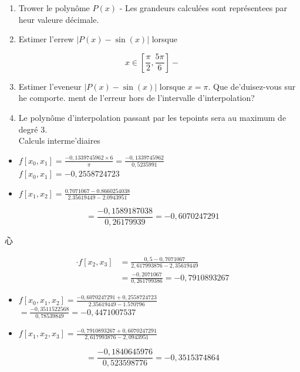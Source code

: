 \documentclass[10pt]{article}
\begin{document}
\begin{enumerate}
  \item Trower le polynôme \(P(x)\) - Les grandeurs calculées sont représentees par heur valeure décimale.
  \item Estimer l'errew \(|P(x)-\sin (x)|\) lorsque
\end{enumerate}

\[
x \in\left[\frac{\pi}{2}, \frac{5 \pi}{6}\right]-
\]

\begin{enumerate}
  \setcounter{enumi}{2}
  \item Estimer l'eveneur \(|P(x)-\sin (x)|\) lorsque \(x=\pi\). Que de'duisez-vous sur he comporte. ment de l'erreur hors de l'intervalle d'interpolation?
  \item Le polynôme d'interpolation passant par les tepoints sera au maximum de degré 3.\\
Calculs interme'diaires
\end{enumerate}

\begin{itemize}
  \item \(f\left[x_{0}, x_{1}\right]=\frac{-0,1339745962 \times 6}{\pi}=\frac{-0,1339745962}{0,5235991}\)\\
\(f\left[x_{0}, x_{1}\right]=-0,2558724723\)
  \item \(f\left[x_{1}, x_{2}\right]=\frac{0.7071067-0.8660254038}{2.35619449-2.0943951}\)
\end{itemize}

\[
=\frac{-0,1589187038}{0,26179939}=-0,6070247291
\]

心

\[
\begin{aligned}
\cdot f\left[x_{2}, x_{3}\right] & =\frac{0,5-0,7071067}{2,617993876-2,35619449} \\
& =\frac{-0,2071067}{0,261799386}=-0,7910893267
\end{aligned}
\]

\begin{itemize}
  \item \(f\left[x_{0}, x_{1}, x_{2}\right]=\frac{-0,6070247291+0,2558724723}{2.35619449-1.570796}\)\\
\(=\frac{-0,3511522568}{0,78539849}=-0,4471007537\)
  \item \(f\left[x_{1}, x_{2}, x_{3}\right]=\frac{-0,7910893267+0,6070247291}{2,617993876-2,0943951}\)
\end{itemize}

\[
=\frac{-0,1840645976}{0,523598776}=-0,3515374864
\]
\end{document}
